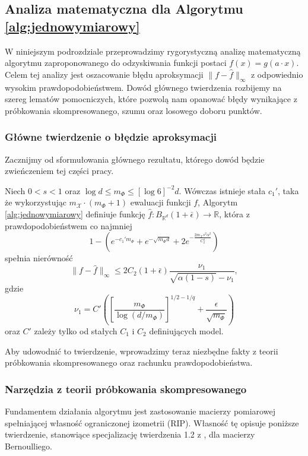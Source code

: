 \subsection{Analiza matematyczna dla Algorytmu \ref{alg:jednowymiarowy}}

W niniejszym podrozdziale przeprowadzimy rygorystyczną analizę matematyczną algorytmu zaproponowanego do odzyskiwania funkcji postaci $f(x)=g(a \cdot x)$. Celem tej analizy jest oszacowanie błędu aproksymacji $\|f - \hat{f}\|_\infty$ z odpowiednio wysokim prawdopodobieństwem. Dowód głównego twierdzenia rozbijemy na szereg lematów pomocniczych, które pozwolą nam opanować błędy wynikające z próbkowania skompresowanego, szumu oraz losowego doboru punktów.

\subsubsection{Główne twierdzenie o błędzie aproksymacji}
Zacznijmy od sformułowania głównego rezultatu, którego dowód będzie zwieńczeniem tej części pracy.

\begin{tw}\label{tw:zbieznoscalgorytmu1}
Niech $0 < s < 1$ oraz $\log d \le m_\Phi \le [\log 6]^{-2}d$. Wówczas istnieje stała $c_1'$, taka że wykorzystując $m_\mathcal{X} \cdot (m_\Phi + 1)$ ewaluacji funkcji $f$, Algorytm \ref{alg:jednowymiarowy} definiuje funkcję $\hat{f}: B_{\mathbb{R}^d}(1+\bar{\epsilon}) \to \mathbb{R}$, która z prawdopodobieństwem co najmniej
$$1 - \left(e^{-c_1' m_\Phi} + e^{-\sqrt{m_\Phi d}} + 2e^{-\frac{2m_\mathcal{X} s^2 \alpha^2}{C_2^4}}\right)$$
spełnia nierówność
$$\|f - \hat{f}\|_\infty \le 2C_2(1+\bar{\epsilon})\frac{\nu_1}{\sqrt{\alpha(1-s)} - \nu_1},$$
gdzie
$$\nu_1 = C' \left( \left[ \frac{m_\Phi}{\log(d/m_\Phi)} \right]^{1/2 - 1/q} + \frac{\epsilon}{\sqrt{m_\Phi}} \right)$$
oraz $C'$ zależy tylko od stałych $C_1$ i $C_2$ definiujących model.
\end{tw}

Aby udowodnić to twierdzenie, wprowadzimy teraz niezbędne fakty z teorii próbkowania skompresowanego oraz rachunku prawdopodobieństwa.

\subsubsection{Narzędzia z teorii próbkowania skompresowanego}

Fundamentem działania algorytmu jest zastosowanie macierzy pomiarowej spełniającej własność ograniczonej izometrii (RIP). Własność tę opisuje poniższe twierdzenie, stanowiące specjalizację twierdzenia 1.2 z \cite{wojtaszczyk2012l1}, dla macierzy Bernoulliego.

